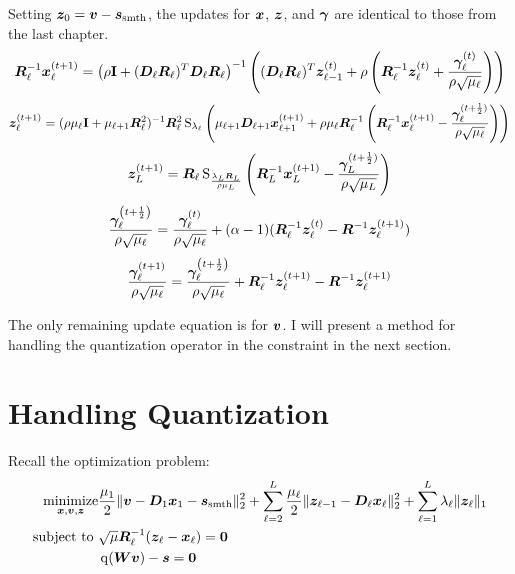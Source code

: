 Setting $\bm{z}_0 = \bm{v} - \bm{s}_{\text{smth}}$, the updates for $\bm{x}$, $\bm{z}$, and $\bm{\gamma}$ are identical to those from the last chapter.
%
\begin{equation} \label{equation:x-update JPEG}
\bm{R}_{\ell}^{-1}\bm{x}_{\ell}^{(t + 1)} = \left(\rho {\bf I} + (\bm{D}_{\ell}\bm{R}_{\ell})^T\bm{D}_{\ell}\bm{R}_{\ell}\right)^{-1}\left((\bm{D}_{\ell}\bm{R}_{\ell})^T\bm{z}_{\ell - 1}^{(t)} + \rho \left(\bm{R}_{\ell}^{-1}\bm{z}_{\ell}^{(t)} + \frac{\bm{\gamma}_{\ell}^{(t)}}{\rho\sqrt{\mu_{\ell}}}\right)\right)
\end{equation}
%
\begin{equation} \label{equation:z-update JPEG}
\bm{z}_{\ell}^{(t + 1)} = (\rho\mu_{\ell}{\bf I} + \mu_{\ell + 1}\bm{R}_{\ell}^2)^{-1}\bm{R}_{\ell}^2\operatorname{S}_{\lambda_{\ell}}\left(\mu_{\ell + 1}\bm{D}_{\ell + 1}\bm{x}_{\ell + 1}^{(t + 1)} + \rho\mu_{\ell}\bm{R}_{\ell}^{-1}\left(\bm{R}_{\ell}^{-1}\bm{x}_{\ell}^{(t + 1)} - \frac{\bm{\gamma}_{\ell}^{(t + \frac{1}{2})}}{\rho\sqrt{\mu_{\ell}}}\right)\right)
\end{equation}
%
\begin{equation}
\bm{z}_L^{(t + 1)} = \bm{R}_{\ell}\operatorname{S}_{\frac{\lambda_L\bm{R}_L}{\rho\mu_L}}\left(\bm{R}_L^{-1}\bm{x}_L^{(t + 1)} - \frac{\bm{\gamma}_L^{(t + \frac{1}{2})}}{\rho\sqrt{\mu_L}}\right)
\end{equation}
%
\begin{equation}
\frac{\bm{\gamma}_{\ell}^{\left(t + \frac{1}{2}\right)}}{\rho\sqrt{\mu_{\ell}}} = \frac{\bm{\gamma}_{\ell}^{(t)}}{\rho\sqrt{\mu_{\ell}}} + (\alpha - 1)(\bm{R}_{\ell}^{-1}\bm{z}_{\ell}^{(t)} - \bm{R}^{-1}\bm{z}_{\ell}^{(t + 1)})
\end{equation}
%
\begin{equation}
\frac{\bm{\gamma}_{\ell}^{(t + 1)}}{\rho\sqrt{\mu_{\ell}}} = \frac{\bm{\gamma}_{\ell}^{\left(t + \frac{1}{2}\right)}}{\rho\sqrt{\mu_{\ell}}} + \bm{R}_{\ell}^{-1}\bm{z}_{\ell}^{(t + 1)} - \bm{R}^{-1}\bm{z}_{\ell}^{(t + 1)} 
\end{equation}
%

The only remaining update equation is for $\bm{v}$. I will present a method for handling the quantization operator in the constraint in the next section.

\section{Handling Quantization}



Recall the optimization problem:
\begin{equation}
\begin{aligned}
\operatorname*{\text{minimize}}_{\bm{x},\bm{v},\bm{z}} & \frac{\mu_1}{2}\|\bm{v} - \bm{D}_1\bm{x}_1  - \bm{s}_{\text{smth}}\|_2^2 + \sum_{\ell = 2}^L \frac{\mu_{\ell}}{2}\|\bm{z}_{\ell - 1} - \bm{D}_{\ell}\bm{x}_{\ell}\|_2^2 + \sum_{\ell = 1}^L \lambda_{\ell}\|\bm{z}_{\ell}\|_1 \\
\text{subject to } & \sqrt{\mu}\bm{R}_{\ell}^{-1}(\bm{z}_{\ell} - \bm{x}_{\ell}) = \bm{0} \\
                   & \operatorname{q}(\bm{W}\bm{v}) - \bm{s} = \bm{0}
\end{aligned}
\end{equation}


